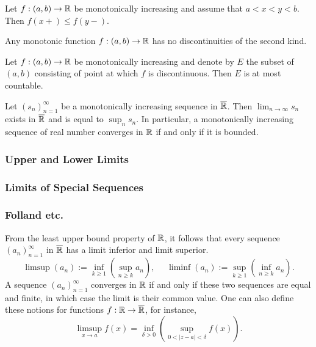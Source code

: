 \documentclass[12pt]{article} %
\begin{document}
\begin{corollary}
    Let $f : (a, b) \to \mathbb{R}$ be monotonically increasing and assume that $a < x < y < b$. Then $f(x+) \leq f(y-)$.
\end{corollary}

\begin{corollary}
    Any monotonic function $f : (a, b) \to \mathbb{R}$ has no discontinuities of the second kind.
\end{corollary}

\begin{theorem}
    Let $f : (a, b) \to \mathbb{R}$ be monotonically increasing and denote by $E$ the subset of $(a, b)$ consisting of point at which $f$ is discontinuous. Then $E$ is at most countable.
\end{theorem}

\begin{theorem}
    Let $(s_n)_{n=1}^{\infty}$ be a monotonically increasing sequence in $\overline{\mathbb{R}}$. Then $\lim_{n \to \infty} s_n$ exists in $\overline{\mathbb{R}}$ and is equal to $\sup_n s_n$. In particular, a monotonically increasing sequence of real number converges in $\mathbb{R}$ if and only if it is bounded.
\end{theorem}

\subsubsection{Upper and Lower Limits}


\subsubsection{Limits of Special Sequences}



\subsubsection{Folland etc.}

From the least upper bound property of $\mathbb{R}$, it follows that every sequence $(a_n)_{n=1}^{\infty}$ in $\overline{\mathbb{R}}$ has a limit inferior and limit superior. \[\limsup(a_n) := \inf_{k \geq 1} \left(\sup_{n \geq k} a_n \right), \ \ \ \ \ \ \liminf(a_n) := \sup_{k \geq 1} \left( \inf_{n \geq k} a_n \right).\]
A sequence $(a_n)_{n=1}^{\infty}$ converges in $\mathbb{R}$ if and only if these two sequences are equal and finite, in which case the limit is their common value. One can also define these notions for functions $f : \mathbb{R} \to \overline{\mathbb{R}}$, for instance, \[\limsup_{x \to a} f(x) = \inf_{\delta > 0} \left( \sup_{0 < |z-a| < \delta} f(x) \right).\]
\end{document}
